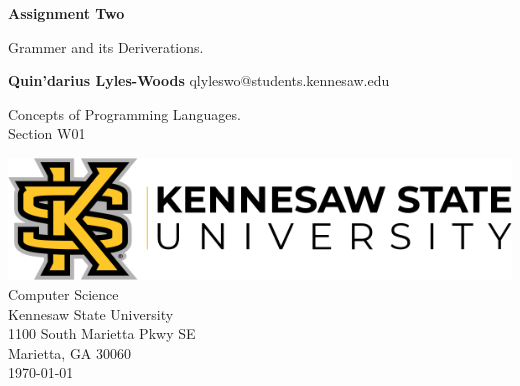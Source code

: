\begin{titlepage}
\begin{center}
	\vspace*{1cm}

	\Huge
	\textbf{Assignment Two}

	\vspace{0.5cm}
	\LARGE
	Grammer and its Deriverations.

	\vspace{1.5cm}

	\textbf{Quin'darius Lyles-Woods}
	\Large
	qlyleswo@students.kennesaw.edu

	\vfill
	\LARGE
	Concepts of Programming Languages.	\\
	Section W01
	\vspace{0.8cm}

	\includegraphics[width=\textwidth]{kennesawlogo}
	\Large
	Computer Science\\
	Kennesaw State University\\
	1100 South Marietta Pkwy SE\\
	Marietta, GA 30060\\
	\today	

	\vspace{1cm}

\end{center}
\end{titlepage}
